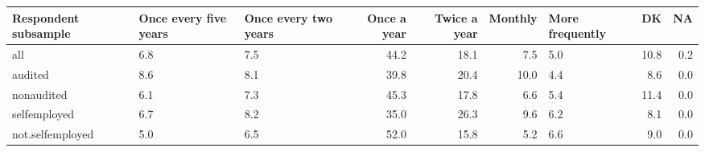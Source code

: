 \begin{table}[ht]
\centering
\begin{tabular}{lL{2cm}L{2cm}rrrL{2cm}rr}
  \hline
Respondent subsample & Once every five years & Once every two years & Once a year & Twice a year & Monthly & More frequently & DK & NA \\ 
  \hline
all & 6.8 & 7.5 & 44.2 & 18.1 & 7.5 & 5.0 & 10.8 & 0.2 \\ 
  audited & 8.6 & 8.1 & 39.8 & 20.4 & 10.0 & 4.4 & 8.6 & 0.0 \\ 
  nonaudited & 6.1 & 7.3 & 45.3 & 17.8 & 6.6 & 5.4 & 11.4 & 0.0 \\ 
  selfemployed & 6.7 & 8.2 & 35.0 & 26.3 & 9.6 & 6.2 & 8.1 & 0.0 \\ 
  not.selfemployed & 5.0 & 6.5 & 52.0 & 15.8 & 5.2 & 6.6 & 9.0 & 0.0 \\ 
   \hline
\end{tabular}
\end{table}
